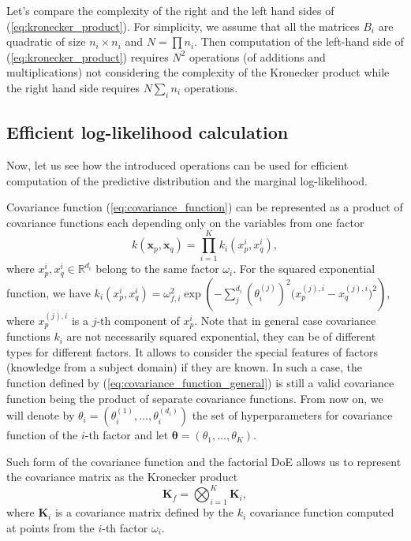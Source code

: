 Let's compare the complexity of the right and the left hand sides of (\ref{eq:kronecker_product}).
For simplicity, we assume that all the matrices $B_i$ are quadratic of size $n_i \times n_i$ and
$N = \prod n_i$.
Then computation of the left-hand side of (\ref{eq:kronecker_product}) requires
$N^2$ operations (of additions and multiplications) not considering the complexity of the Kronecker product
while the right hand side requires $N \sum_i n_i$ operations.


\subsection{Efficient log-likelihood calculation}
\label{sec:calc_loglikelihood}
Now, let us see how the introduced operations can be used for efficient
computation of the predictive distribution and the marginal log-likelihood.

Covariance function (\ref{eq:covariance_function}) can be represented as
a product of covariance functions each depending only on the variables from one factor
\begin{equation}
  \label{eq:covariance_function_general}
  k(\mathbf{x}_p, \mathbf{x}_q) = \prod_{i = 1}^K k_i(x_p^i, x_q^i),
\end{equation}
where $x_p^i, x_q^i \in \mathbb{R}^{d_i}$ belong to the same factor $\omega_i$.
For the squared exponential function, we have $k_i(x_p^i, x_q^i) = \omega_{f, i}^2\exp \left ( -\sum_j^{d_i} \left (\theta_i^{(j)} \right )^2
  \big (x_p^{(j), i} - x_q^{(j), i} \big )^2 \right )$,
where $x_p^{(j), i}$ is a $j$-th component of $x_p^i$.
Note that in general case covariance functions $k_i$ are not necessarily squared exponential, they can be of different types for different factors.
It allows to consider the special features of factors (knowledge from a subject domain) if they are known.
In such a case, the function defined by (\ref{eq:covariance_function_general}) is still a valid
covariance function being the product of separate covariance functions.
From now on, we will denote by $\theta_i = (\theta_i^{(1)}, \ldots, \theta_i^{(d_i)})$ the set of hyperparameters for covariance
function of the $i$-th factor and let $\boldsymbol{\theta} = (\theta_1, \ldots, \theta_K)$.

Such form of the covariance function and the factorial DoE
allows us to represent the covariance matrix as the Kronecker product
\begin{equation}
  \label{eq:covariance_kronecker}
  \mathbf{K}_f = \bigotimes_{i = 1}^K\mathbf{K}_i,
\end{equation}
where $\mathbf{K}_i$ is a covariance matrix defined by the $k_i$ covariance function
computed at points from the $i$-th factor $\omega_i$.

